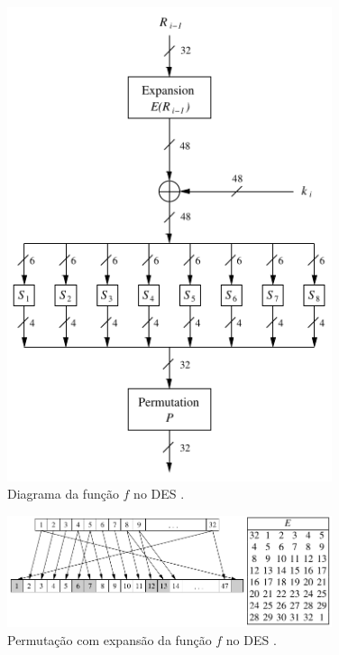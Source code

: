 \begin{frame}[allowframebreaks]
\begin{figure}[h]
\centering
\includegraphics[width=0.85\textwidth,height=0.65\textheight,keepaspectratio]{figures/DES-diagrama-funcaof.png}
\caption{Diagrama da função $f$ no DES \cite{paar2014}.}
\label{fig-DES-diagrama-funcaof}
\end{figure}

 \framebreak

\begin{figure}[h]
\centering
\includegraphics[width=0.85\textwidth,height=0.65\textheight,keepaspectratio]{figures/DES-expansion.png}
\caption{Permutação com expansão da função $f$ no DES \cite{paar2014}.}
\label{fig-DES-expansion}
\end{figure}


\end{frame}
